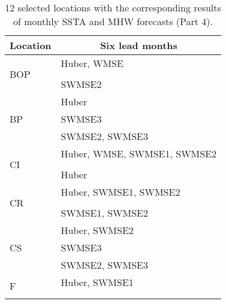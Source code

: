 \documentclass[11pt, a4paper]{article}
\begin{document}
\begin{table}[H]
\centering
\footnotesize
\caption{12 selected locations with the corresponding results of monthly SSTA and MHW forecasts (Part 4).}
\begin{tabular}{ll}
\multicolumn{1}{c}{\textbf{Location}} & \multicolumn{1}{c}{\textbf{Six lead months}} \\ \hline
\multirow{3}{*}{BOP}                  & Huber, WMSE                                  \\
                                      &                                              \\
                                      & SWMSE2                                       \\ \hline
\multirow{3}{*}{BP}                   & Huber                                        \\
                                      & SWMSE3                                       \\
                                      & SWMSE2, SWMSE3                               \\ \hline
\multirow{3}{*}{CI}                   & Huber, WMSE, SWMSE1, SWMSE2                  \\
                                      &                                              \\
                                      & Huber                                        \\ \hline
\multirow{3}{*}{CR}                   & Huber, SWMSE1, SWMSE2                        \\
                                      &                                              \\
                                      & SWMSE1, SWMSE2                               \\ \hline
\multirow{3}{*}{CS}                   & Huber, SWMSE2                                \\
                                      & SWMSE3                                       \\
                                      & SWMSE2, SWMSE3                               \\ \hline
\multirow{3}{*}{F}                    & Huber, SWMSE1                                \\
                                      &                                              \\
                                      &                                              \\ \hline

\end{tabular}
\end{table}
\end{document}
